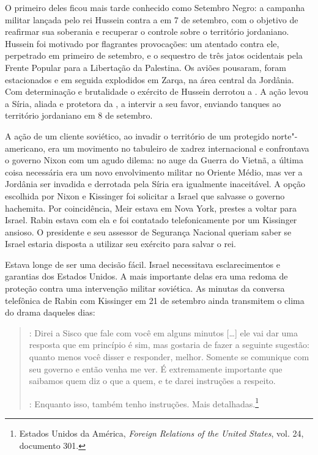 O primeiro deles ficou mais tarde conhecido como Setembro Negro: a
campanha militar lançada pelo rei Hussein contra a  em 7 de setembro,
com o objetivo de reafirmar sua soberania e recuperar o controle sobre o
território jordaniano. Hussein foi motivado por flagrantes provocações:
um atentado contra ele, perpetrado em primeiro de setembro, e o
sequestro de três jatos ocidentais pela Frente Popular para a Libertação
da Palestina. Os aviões pousaram, foram estacionados e em seguida
explodidos em Zarqa, na área central da Jordânia. Com determinação e
brutalidade o exército de Hussein derrotou a . A ação levou a Síria,
aliada e protetora da , a intervir a seu favor, enviando tanques ao
território jordaniano em 8 de setembro.

A ação de um cliente soviético, ao invadir o território de um protegido
norte"-americano, era um movimento no tabuleiro de xadrez internacional
e confrontava o governo Nixon com um agudo dilema: no auge da Guerra do
Vietnã, a última coisa necessária era um novo envolvimento militar no
Oriente Médio, mas ver a Jordânia ser invadida e derrotada pela Síria
era igualmente inaceitável. A opção escolhida por Nixon e Kissinger foi
solicitar a Israel que salvasse o governo hachemita. Por coincidência,
Meir estava em Nova York, prestes a voltar para Israel. Rabin estava
com ela e foi contatado telefonicamente por um Kissinger ansioso. O
presidente e seu assessor de Segurança Nacional queriam saber se Israel
estaria disposta a utilizar seu exército para salvar o rei.

Estava longe de ser uma decisão fácil. Israel necessitava
esclarecimentos e garantias dos Estados Unidos. A mais importante delas era uma
redoma de proteção contra uma intervenção militar soviética. As minutas
da conversa telefônica de Rabin com Kissinger em 21 de setembro ainda
transmitem o clima do drama daqueles dias:

\begin{quote}
: Direi a Sisco que fale com você em alguns minutos {[}\ldots{}{]} ele vai
dar uma resposta que em princípio é sim, mas gostaria de fazer a
seguinte sugestão: quanto menos você disser e responder, melhor. Somente
se comunique com seu governo e então venha me ver. É extremamente
importante que saibamos quem diz o que a quem, e te darei instruções a
respeito.

: Enquanto isso, também tenho instruções. Mais
detalhadas.\footnote{Estados Unidos da América, \emph{Foreign Relations of the United States}, vol. 24, documento 301.}
\end{quote}

